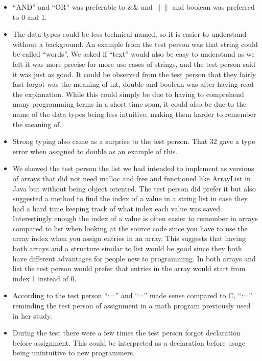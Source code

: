 \begin{itemize}
 \item “AND” and “OR” was preferable to $\&\&$ and $\|\|$ and boolean was preferred to 0 and 1.
 \item The data types could be less technical named, so it is easier to understand without a background. An example from the test person was that string could be called “words”. We asked if “text” would also be easy to understand as we felt it was more precise for more use cases of strings, and the test person said it was just as good. It could be observed from the test person that they fairly fast forgot was the meaning of int, double and boolean was after having read the explanation. While this could simply be due to having to comprehend many programming terms in a short time span, it could also be due to the name of the data types being less intuitive, making them harder to remember the meaning of.
 \item Strong typing also came as a surprise to the test person. That 32 gave a type error when assigned to double as an example of this.
 \item We showed the test person the list we had intended to implement as versions of arrays that did not need malloc and free and functioned like ArrayList in Java but without being object oriented. The test person did prefer it but also suggested a method to find the index of a value in a string list in case they had a hard time keeping track of what index each value was saved. Interestingly enough the index of a value is often easier to remember in arrays compared to list when looking at the source code since you have to use the array index when you assign entries in an array. This suggests that having both arrays and a structure similar to list would be good since they both have different advantages for people new to programming. In both arrays and list the test person would prefer that entries in the array would start from index 1 instead of 0.
 \item According to the test person “:=” and “=” made sense compared to C, “:=” reminding the test person of assignment in a math program previously used in her study.
 \item During the test there were a few times the test person forgot declaration before assignment. This could be interpreted as a declaration before usage being unintuitive to new programmers.
\end{itemize}

